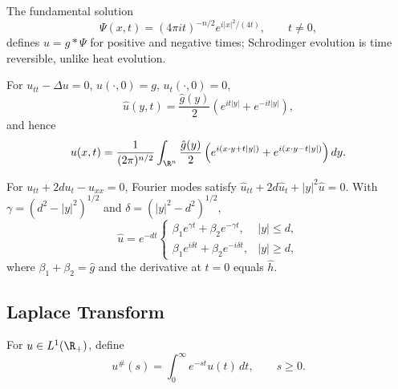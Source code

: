 \begin{remark}
\label{rem:schrodinger-time-reversibility}
The fundamental solution
\[
\Psi(x,t)=(4\pi it)^{-n/2}e^{i|x|^2/(4t)},\qquad t\ne0,
\]
defines $u=g*\Psi$ for positive and negative times; Schrodinger evolution is
time reversible, unlike heat evolution.
\end{remark}

\begin{example}
\label{ex:fourier-transform-wave-equation}
For $u_{tt}-\Delta u=0$, $u(\cdot,0)=g$, $u_t(\cdot,0)=0$,
\[
\hat u(y,t)=\frac{\hat g(y)}2(e^{it|y|}+e^{-it|y|}),
\]
and hence
\[
u(x,t)=\frac1{(2\pi)^{n/2}}\int_{\R^n}\frac{\hat g(y)}2
\left(e^{i(x\cdot y+t|y|)}+e^{i(x\cdot y-t|y|)}\right)dy.
\]
\end{example}

\begin{example}
\label{ex:telegraph-equation-fourier-transform}
For $u_{tt}+2du_t-u_{xx}=0$, Fourier modes satisfy
$\hat u_{tt}+2d\hat u_t+|y|^2\hat u=0$. With
$\gamma=(d^2-|y|^2)^{1/2}$ and $\delta=(|y|^2-d^2)^{1/2}$,
\[
\hat u=e^{-dt}\begin{cases}
\beta_1e^{\gamma t}+\beta_2e^{-\gamma t},&|y|\le d,\\
\beta_1e^{i\delta t}+\beta_2e^{-i\delta t},&|y|\ge d,
\end{cases}
\]
where $\beta_1+\beta_2=\hat g$ and the derivative at $t=0$ equals $\hat h$.
\end{example}

\subsection{Laplace Transform}
\label{sec:laplace-transform}

\begin{definition}
\label{def:laplace-transform}
For $u\in L^1(\R_+)$, define
\[
u^\#(s)=\int_0^\infty e^{-st}u(t)\,dt,\qquad s\ge0.
\]
\end{definition}

